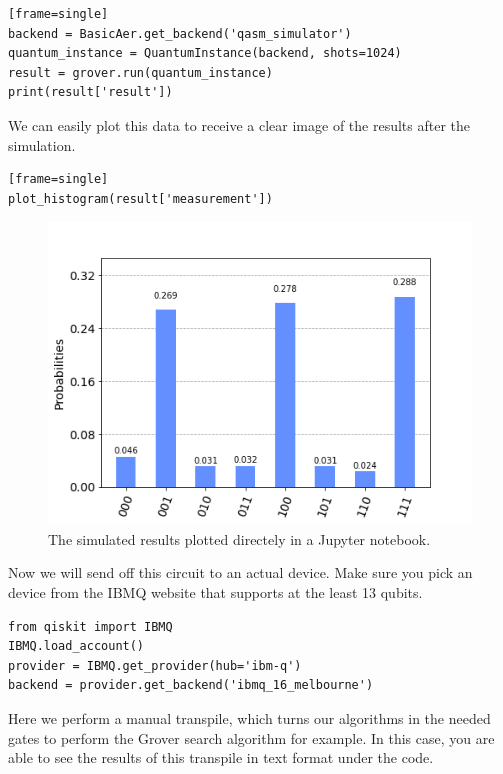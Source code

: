 \begin{verbatim}[frame=single]
backend = BasicAer.get_backend('qasm_simulator')
quantum_instance = QuantumInstance(backend, shots=1024)
result = grover.run(quantum_instance)
print(result['result'])
\end{verbatim}

We can easily plot this data to receive a clear image of the results after the simulation.

\begin{verbatim}[frame=single]
plot_histogram(result['measurement'])
\end{verbatim}

\begin{figure}
	\centering
	\includegraphics[scale = 0.75]{../Demonstration/img/simulated_3SAT.PNG}
	\caption{The simulated results plotted directely in a Jupyter notebook.}
\end{figure}

Now we will send off this circuit to an actual device. Make sure you pick an device from the IBMQ website that supports at the least 13 qubits.

\begin{verbatim}
from qiskit import IBMQ
IBMQ.load_account()
provider = IBMQ.get_provider(hub='ibm-q')
backend = provider.get_backend('ibmq_16_melbourne')
\end{verbatim}

Here we perform a manual transpile, which turns our algorithms in the needed gates to perform the Grover search algorithm for example. In this case, you are able to see the results of this transpile in text format under the code.

